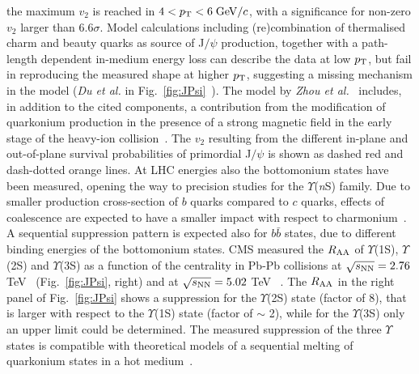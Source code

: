 the maximum $v_2$ is reached in $4 < p_{\rm T} < 6\; \mathrm{GeV}/c$, with a 
significance for non-zero $v_2$ larger than $6.6\sigma$. Model calculations 
including (re)combination of thermalised charm and beauty quarks as 
source of J$/\psi$ production, together with a path-length dependent in-medium 
energy loss can describe the data at low $p_{\rm T}$, but fail in 
reproducing the measured shape at higher $p_{\rm T}$, suggesting a missing mechanism in the 
model ({\it Du et al.} in Fig.~\ref{fig:JPsi}~\cite{Du:2015wha}). The model by 
{\it Zhou et al.}~\cite{Zhou:2014kka} includes, in addition to the cited components, 
a contribution from the modification of quarkonium production in the presence 
of a strong magnetic field in the early stage of the heavy-ion collision~\cite{Guo:2015nsa}. 
The $v_2$ resulting from the different in-plane and out-of-plane survival 
probabilities of primordial J$/\psi$ is shown as dashed red and dash-dotted 
orange lines. At LHC energies also the bottomonium states have been 
measured, opening the way to precision studies for the $\Upsilon$({\it n}S) 
family. Due to smaller production cross-section of $b$ quarks compared to $c$ quarks, 
effects of coalescence are
expected to have a smaller impact with respect to charmonium~\cite{Andronic:2015wma}. 
A sequential suppression pattern is expected also for $b\bar{b}$ states, due to 
different binding energies of the bottomonium states. CMS measured 
the $R_{\rm AA}$ of $\Upsilon$(1S), $\Upsilon$(2S) and $\Upsilon$(3S) as a 
function of the centrality in Pb-Pb collisions at 
$\sqrt{s_{\rm NN}} = 2.76$ TeV~\cite{Khachatryan:2016xxp} (Fig.~\ref{fig:JPsi}, right) and at 
$\sqrt{s_{\rm NN}} = 5.02$ TeV~	\cite{Sirunyan:2017lzi}. The $R_{\rm AA}$ in the right panel of Fig.~\ref{fig:JPsi} shows a 
suppression for the $\Upsilon$(2S) state (factor of 8), that is larger with 
respect to the $\Upsilon$(1S) state (factor of $\sim$ 2), while for 
the $\Upsilon$(3S) only an upper limit could be determined.
The measured suppression of the three $\Upsilon$ states is compatible 
with theoretical models of a sequential melting of quarkonium states in a 
hot medium~\cite{Khachatryan:2016xxp}.
